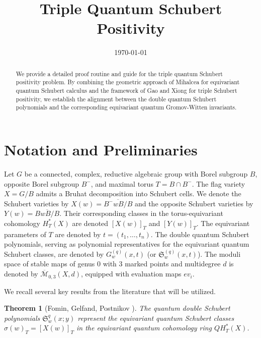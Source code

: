 \documentclass{amsart}
\newtheorem{theorem}{Theorem}[section]
\theoremstyle{definition}
\begin{document}
\title{Triple Quantum Schubert Positivity}
\author{}
\date{\today}

\begin{abstract}
We provide a detailed proof routine and guide for the triple quantum Schubert positivity problem. By combining the geometric approach of Mihalcea \cite{Mihalcea2006} for equivariant quantum Schubert calculus and the framework of Gao and Xiong \cite{GaoXiong2023} for triple Schubert positivity, we establish the alignment between the double quantum Schubert polynomials and the corresponding equivariant quantum Gromov-Witten invariants.
\end{abstract}

\maketitle

\section{Notation and Preliminaries}

Let $G$ be a connected, complex, reductive algebraic group with Borel subgroup $B$, opposite Borel subgroup $B^-$, and maximal torus $T = B \cap B^-$. The flag variety $X = G/B$ admits a Bruhat decomposition into Schubert cells. We denote the Schubert varieties by $X(w) = \overline{B^- w B / B}$ and the opposite Schubert varieties by $Y(w) = \overline{B w B / B}$. Their corresponding classes in the torus-equivariant cohomology $H_T^*(X)$ are denoted $[X(w)]_T$ and $[Y(w)]_T$. The equivariant parameters of $T$ are denoted by $t = (t_1, \ldots, t_n)$. The double quantum Schubert polynomials, serving as polynomial representatives for the equivariant quantum Schubert classes, are denoted by $G_w^{(q)}(x, t)$ (or $\mathfrak{S}_w^{(q)}(x, t)$). The moduli space of stable maps of genus 0 with 3 marked points and multidegree $d$ is denoted by $\overline{\mathcal{M}}_{0,3}(X,d)$, equipped with evaluation maps $ev_i$.

We recall several key results from the literature that will be utilized.

\begin{theorem}[Fomin, Gelfand, Postnikov \cite{FGP1997}]\label{thm:fgp}
The quantum double Schubert polynomials $\mathfrak{S}_w^q(x;y)$ represent the equivariant quantum Schubert classes $\sigma(w)_T = [X(w)]_T$ in the equivariant quantum cohomology ring $QH_T^*(X)$.
\end{theorem}
\end{document}
